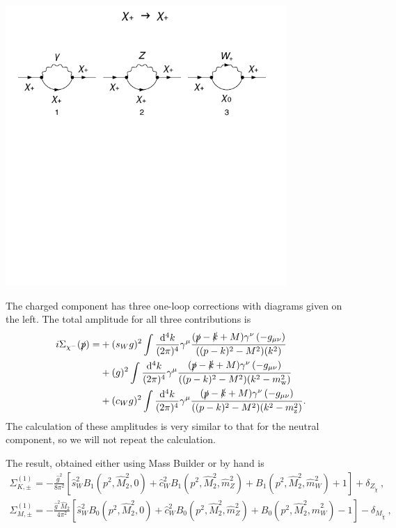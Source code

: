\documentclass[11pt]{article}
\def\cm{\chi^-}
\renewcommand{\d}{\ensuremath{\operatorname{d}\!}}
\newcommand{\mb}{\textsf{Mass Builder} }
\begin{document}
\begin{minipage}{0.3\textwidth}
\includegraphics[width=0.8\textwidth]{F1_1_c.pdf}
\end{minipage}
\noindent\begin{minipage}{0.7\textwidth}

The charged component has three one-loop corrections with diagrams given on the left.  The total amplitude for all three contributions is
\begin{align}
\begin{split}
i\Sigma_{\cm}(\slashed{p})=
&+(s_Wg)^2 \int \frac{\d^4k}{(2\pi)^4} \gamma^{\mu}\frac{(\slashed{p}-\slashed{k}+M)\gamma^{\nu}\left(-g_{\mu\nu}\right)}{((p-k)^2-M^2)(k^2)}\\
&+(g)^2 \int \frac{\d^4k}{(2\pi)^4} \gamma^{\mu}\frac{(\slashed{p}-\slashed{k}+M)\gamma^{\nu}\left(-g_{\mu\nu}\right)}{((p-k)^2-M^2)(k^2-m_{\text{w}}^2)}\\
&+(c_Wg)^2 \int \frac{\d^4k}{(2\pi)^4} \gamma^{\mu}\frac{(\slashed{p}-\slashed{k}+M)\gamma^{\nu}\left(-g_{\mu\nu}\right)}{((p-k)^2-M^2)(k^2-m_{\text{z}}^2)}.
\end{split}
\end{align}
The calculation of these amplitudes is very similar to that for the neutral component, so we will not repeat the calculation. 

\end{minipage}
The result, obtained either using \mb or by hand is
{
\begin{eqnarray}
\Sigma_{K, \pm}^{(1)} =
-\frac{\hat{g}^2}{8\pi^2}
\left[ \hat{s}_W^2 B_1(p^2,\hat{M}_2^2,0)
+\hat{c}_W^2 B_1(p^2,\hat{M}_2^2, \hat m_Z^2)
+B_1(p^2, \hat{M}_2^2, \hat{m}_W^2) + 1  \right]
+ \delta_{Z_{\tilde{\chi}}}\ , \label{eq: Cha_K} \\
\Sigma_{M, \pm}^{(1)} =
-\frac{\hat{g}^2 \hat{M}_2}{4\pi^2}
\left[ \hat{s}_W^2 B_0(p^2, \hat{M}_2^2,0)
+\hat{c}_W^2 B_0(p^2, \hat{M}_2^2, \hat{m}_Z^2)
+B_0(p^2, \hat{M}_2^2, \hat{m}_W^2) - 1 \right]
-\delta_{M_{\tilde{\chi}}}\ ,
 \label{eq: Cha_M}
\end{eqnarray}
}
\end{document}
